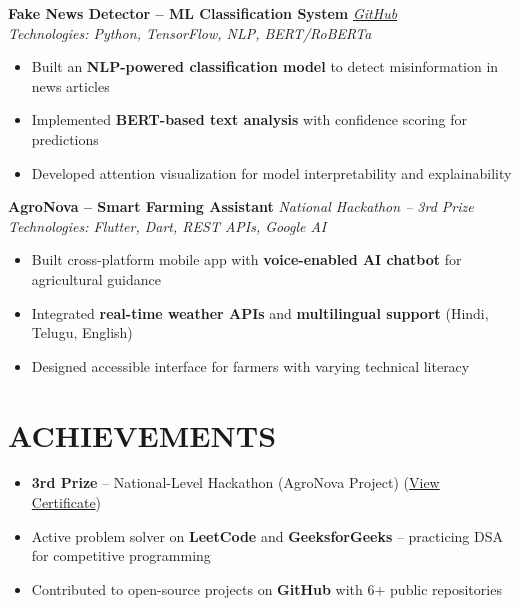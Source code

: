\documentclass[10pt, letterpaper]{article}
\begin{document}
\vspace{4pt}
\textbf{Fake News Detector – ML Classification System} \hfill \href{https://github.com/TheCraftsman1/fake-news}{\textit{GitHub}} \\
\textit{Technologies: Python, TensorFlow, NLP, BERT/RoBERTa}
\begin{itemize}[noitemsep, leftmargin=*, topsep=2pt]
    \item Built an \textbf{NLP-powered classification model} to detect misinformation in news articles
    \item Implemented \textbf{BERT-based text analysis} with confidence scoring for predictions
    \item Developed attention visualization for model interpretability and explainability
\end{itemize}

\vspace{4pt}
\textbf{AgroNova – Smart Farming Assistant} \hfill \textit{National Hackathon – 3rd Prize} \\
\textit{Technologies: Flutter, Dart, REST APIs, Google AI}
\begin{itemize}[noitemsep, leftmargin=*, topsep=2pt]
    \item Built cross-platform mobile app with \textbf{voice-enabled AI chatbot} for agricultural guidance
    \item Integrated \textbf{real-time weather APIs} and \textbf{multilingual support} (Hindi, Telugu, English)
    \item Designed accessible interface for farmers with varying technical literacy
\end{itemize}

\section{ACHIEVEMENTS}
\begin{itemize}[noitemsep, leftmargin=*, topsep=2pt]
    \item \textbf{3rd Prize} – National-Level Hackathon (AgroNova Project) (\href{https://drive.google.com/file/d/1a7UQF-YOi3fZGQpJhJwUWzeKpDKSEjIO/view?usp=sharing}{View Certificate})
    \item Active problem solver on \textbf{LeetCode} and \textbf{GeeksforGeeks} – practicing DSA for competitive programming
    \item Contributed to open-source projects on \textbf{GitHub} with 6+ public repositories
\end{itemize}
\end{document}
